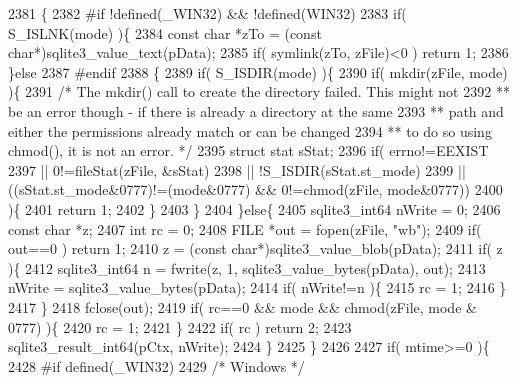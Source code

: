 \begin{DoxyCode}
2381  \{
2382 \textcolor{preprocessor}{#if !defined(\_WIN32) && !defined(WIN32)}
2383   \textcolor{keywordflow}{if}( S\_ISLNK(mode) )\{
2384     \textcolor{keyword}{const} \textcolor{keywordtype}{char} *zTo = (\textcolor{keyword}{const} \textcolor{keywordtype}{char}*)sqlite3_value_text(pData);
2385     \textcolor{keywordflow}{if}( symlink(zTo, zFile)<0 ) \textcolor{keywordflow}{return} 1;
2386   \}\textcolor{keywordflow}{else}
2387 \textcolor{preprocessor}{#endif}
2388   \{
2389     \textcolor{keywordflow}{if}( S\_ISDIR(mode) )\{
2390       \textcolor{keywordflow}{if}( mkdir(zFile, mode) )\{
2391         \textcolor{comment}{/* The mkdir() call to create the directory failed. This might not}
2392 \textcolor{comment}{        ** be an error though - if there is already a directory at the same}
2393 \textcolor{comment}{        ** path and either the permissions already match or can be changed}
2394 \textcolor{comment}{        ** to do so using chmod(), it is not an error.  */}
2395         \textcolor{keyword}{struct }stat sStat;
2396         \textcolor{keywordflow}{if}( errno!=EEXIST
2397          || 0!=fileStat(zFile, &sStat)
2398          || !S\_ISDIR(sStat.st\_mode)
2399          || ((sStat.st\_mode&0777)!=(mode&0777) && 0!=chmod(zFile, mode&0777))
2400         )\{
2401           \textcolor{keywordflow}{return} 1;
2402         \}
2403       \}
2404     \}\textcolor{keywordflow}{else}\{
2405       sqlite3_int64 nWrite = 0;
2406       \textcolor{keyword}{const} \textcolor{keywordtype}{char} *z;
2407       \textcolor{keywordtype}{int} rc = 0;
2408       FILE *out = fopen(zFile, \textcolor{stringliteral}{"wb"});
2409       \textcolor{keywordflow}{if}( out==0 ) \textcolor{keywordflow}{return} 1;
2410       z = (\textcolor{keyword}{const} \textcolor{keywordtype}{char}*)sqlite3_value_blob(pData);
2411       \textcolor{keywordflow}{if}( z )\{
2412         sqlite3_int64 n = fwrite(z, 1, sqlite3_value_bytes(pData), out);
2413         nWrite = sqlite3_value_bytes(pData);
2414         \textcolor{keywordflow}{if}( nWrite!=n )\{
2415           rc = 1;
2416         \}
2417       \}
2418       fclose(out);
2419       \textcolor{keywordflow}{if}( rc==0 && mode && chmod(zFile, mode & 0777) )\{
2420         rc = 1;
2421       \}
2422       \textcolor{keywordflow}{if}( rc ) \textcolor{keywordflow}{return} 2;
2423       sqlite3_result_int64(pCtx, nWrite);
2424     \}
2425   \}
2426 
2427   \textcolor{keywordflow}{if}( mtime>=0 )\{
2428 \textcolor{preprocessor}{#if defined(\_WIN32)}
2429     \textcolor{comment}{/* Windows */}

\end{DoxyCode}
